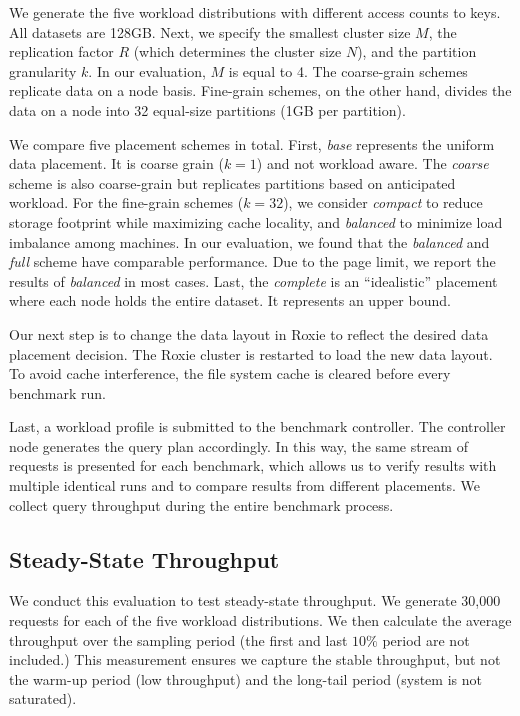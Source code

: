 We generate the five workload distributions
with different access counts to keys.
All datasets are 128GB.
Next, we specify the smallest cluster size $M$,
the replication factor $R$ (which determines
the cluster size $N$), and
the partition granularity $k$.
In our evaluation, $M$ is equal to 4.
The coarse-grain schemes replicate data on
a node basis.
Fine-grain schemes, on the other hand,
divides the data on a node into 32 equal-size partitions
(1GB per partition).

We compare five placement schemes in total.
First, \emph{base} represents the uniform data placement.
It is coarse grain ($k=1$) and not workload aware.
The \emph{coarse} scheme is also coarse-grain but replicates partitions
based on anticipated workload.
For the fine-grain schemes ($k=32$), we consider
\emph{compact} to reduce storage footprint while maximizing cache locality,
and \emph{balanced} to minimize load imbalance among machines.
In our evaluation, we found that the \emph{balanced} and \emph{full} scheme
have comparable performance.
Due to the page limit, we report the results of \emph{balanced} in most cases.
Last, the \emph{complete} is an ``idealistic'' placement where each
node holds the entire dataset.
It represents an upper bound.



Our next step is to change the data layout in Roxie to reflect
the desired data placement decision.
The Roxie cluster is restarted to load the new data layout.
To avoid cache interference, the file system cache is cleared
before every benchmark run.

Last, a workload profile is submitted to the benchmark controller.
The controller node generates the query plan accordingly.
In this way, the same stream of requests is presented for each
benchmark, which allows us to verify results with multiple identical
runs and to compare results from different placements.
We collect query throughput during the entire benchmark process.

\subsection{Steady-State Throughput}
\label{sec:throughput}

We conduct this evaluation to test steady-state throughput.
We generate 30,000 requests for each of the five workload
distributions.
We then calculate the average throughput over the sampling period
(the first and last $10\%$ period are not included.)
This measurement ensures we capture the stable throughput, but not
the warm-up period (low throughput) and
the long-tail period (system is not saturated).


